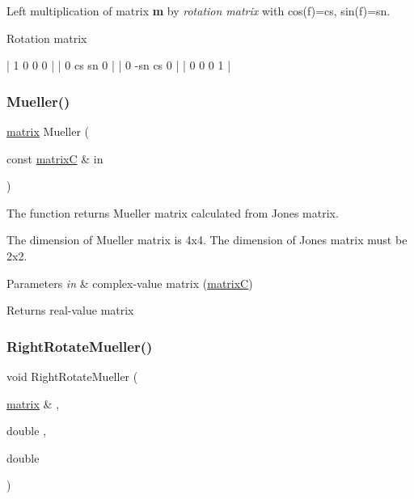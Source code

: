 Left multiplication of matrix {\bfseries m} by {\itshape  rotation matrix } with cos(f)=cs, sin(f)=sn. 

Rotation matrix 
\begin{DoxyCode}
| 1  0   0   0 |
| 0  cs  sn  0 |
| 0  -sn cs  0 |
| 0  0   0   1 |
\end{DoxyCode}
 \mbox{\label{group___ax_func_gaa3c0276f7292390c42f6a0e54912f243}} 
\subsubsection{\texorpdfstring{Mueller()}{Mueller()}}
{\footnotesize\ttfamily \mbox{\hyperlink{classmatrix}{matrix}} Mueller (\begin{DoxyParamCaption}\item[{const \mbox{\hyperlink{classmatrix_c}{matrixC}} \&}]{in }\end{DoxyParamCaption})}



The function returns Mueller matrix calculated from Jones matrix. 

The dimension of Mueller matrix is 4x4. The dimension of Jones matrix must be 2x2. 
\begin{DoxyParams}{Parameters}
{\em in} & complex-\/value matrix (\mbox{\hyperlink{classmatrix_c}{matrixC}}) \\
\hline
\end{DoxyParams}
\begin{DoxyReturn}{Returns}
real-\/value matrix 
\end{DoxyReturn}
\mbox{\label{group___ax_func_ga4caf171817a28cab6689b5a05ac15ee9}} 
\subsubsection{\texorpdfstring{Right\+Rotate\+Mueller()}{RightRotateMueller()}}
{\footnotesize\ttfamily void Right\+Rotate\+Mueller (\begin{DoxyParamCaption}\item[{\mbox{\hyperlink{classmatrix}{matrix}} \&}]{,  }\item[{double}]{,  }\item[{double}]{ }\end{DoxyParamCaption})}



